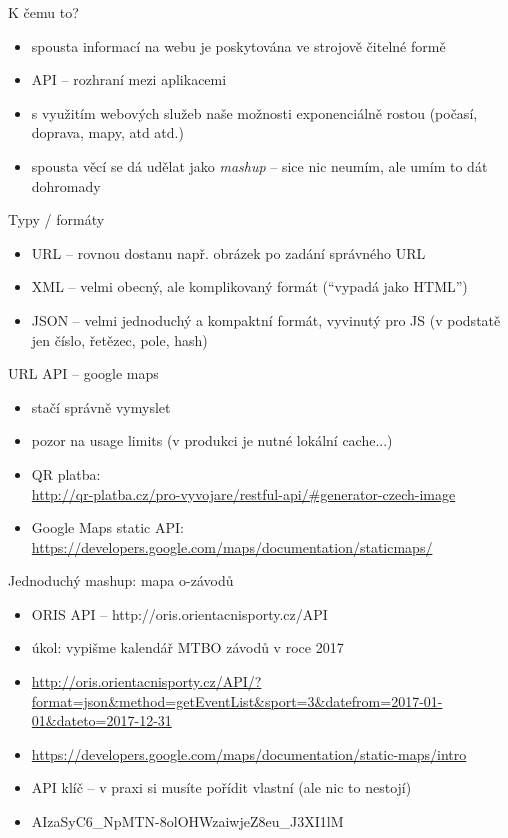 \documentclass{beamer}
\begin{document}
\begin{frame}{K čemu to?}
  \begin{itemize}
    \item spousta informací na webu je poskytována ve strojově čitelné formě
    \item API -- rozhraní mezi aplikacemi
    \item s využitím webových služeb naše možnosti exponenciálně rostou (počasí, doprava, mapy, atd atd.)
    \item spousta věcí se dá udělat jako \emph{mashup} -- sice nic neumím, ale umím to dát dohromady
  \end{itemize}
\end{frame}


\begin{frame}{Typy / formáty}
  \begin{itemize}
    \item URL -- rovnou dostanu např. obrázek po zadání správného URL
    \item XML -- velmi obecný, ale komplikovaný formát (``vypadá jako HTML'')
    \item JSON -- velmi jednoduchý a kompaktní formát, vyvinutý pro JS (v podstatě jen číslo, řetězec, pole, hash)
  \end{itemize}
\end{frame}


\begin{frame}{URL API -- google maps}
  \begin{itemize}
    \item stačí správně vymyslet
    \item pozor na usage limits (v produkci je nutné lokální cache...)
    \item QR platba: \\
    {\tiny \url{http://qr-platba.cz/pro-vyvojare/restful-api/\#generator-czech-image}}
    \item Google Maps static API: \\
    {\tiny \url{https://developers.google.com/maps/documentation/staticmaps/}}
  \end{itemize}
\end{frame}


\begin{frame}{Jednoduchý mashup: mapa o-závodů}
  \begin{itemize}
    \item ORIS API -- http://oris.orientacnisporty.cz/API
    \item úkol: vypišme kalendář MTBO závodů v roce 2017
    \item {\tiny \url{http://oris.orientacnisporty.cz/API/?format=json\&method=getEventList\&sport=3\&datefrom=2017-01-01\&dateto=2017-12-31}}
    \item {\tiny \url{https://developers.google.com/maps/documentation/static-maps/intro}}
    \item API klíč -- v praxi si musíte pořídit vlastní (ale nic to nestojí)
    \item AIzaSyC6\_NpMTN-8olOHWzaiwjeZ8eu\_J3XI1lM
  \end{itemize}
\end{frame}
\end{document}
